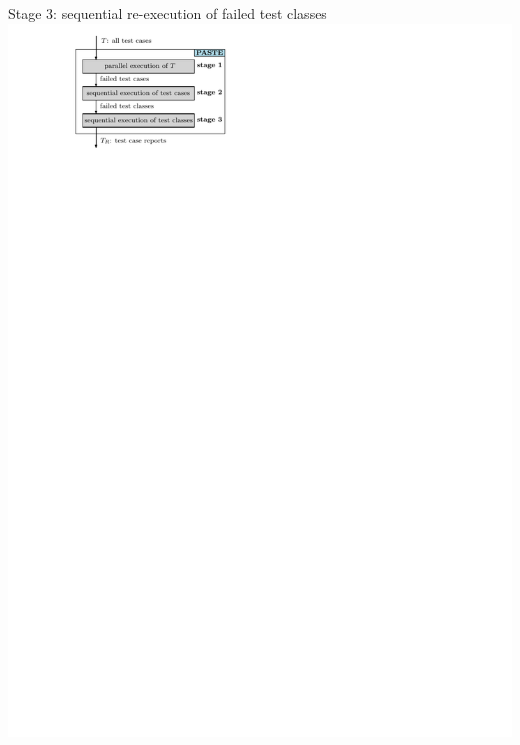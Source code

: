 \documentclass{beamer}
\begin{document}
\begin{frame}{Stage 3: sequential re-execution of failed test classes}
	\centering 
	\includegraphics[width=0.65\linewidth,page=4]{images/soundy.pdf}
\end{frame}
\end{document}
